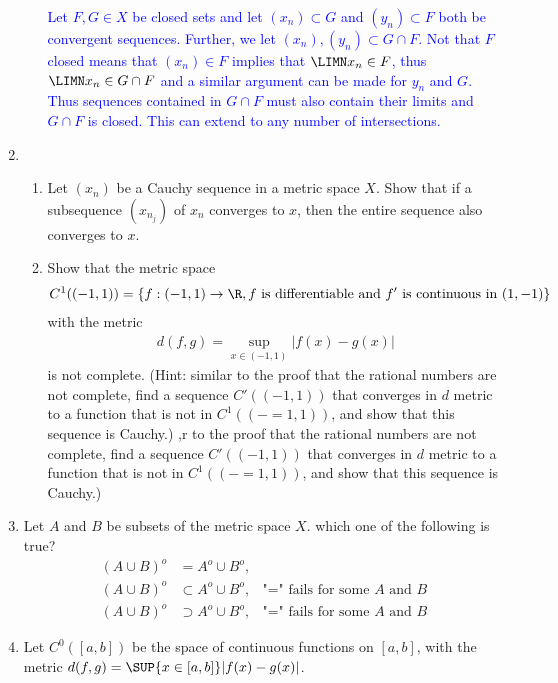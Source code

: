 \documentclass[10pt,a4paper]{report}
\newcommand{\BLUE}[1]{\textcolor{blue}{#1}}
\begin{document}
\begin{enumerate}[label=\Roman*.]
\begin{enumerate}[label=(\alph*)]
		\BLUE{Let $F, G \in X$ be closed sets and let $(x_n) \subset G$ and $(y_n) \subset F$ both be convergent sequences. Further, we let $(x_n), (y_n) \subset G\cap F$. Not that $F$ closed means that $(x_n) \in F$ implies that $\LIMN x_n \in F$, thus $\LIMN x_n \in G \cap F$ and a similar argument can be made for $y_n$ and $G$.  Thus sequences contained in $G\cap F$ must also contain their limits and $G\cap F$ is closed.  This can extend to any number of intersections.
		}
	\end{enumerate}
	
	\item\begin{enumerate}[label=(\alph*)]
		\item Let $(x_n)$ be a Cauchy sequence in a metric space $X$.  Show that if a subsequence $(x_{n_j})$ of $x_n$ converges to $x$, then the entire sequence also converges to $x$.
		\item Show that the metric space
		\begin{align*}
			C^1((-1,1))=\{f:(-1,1)\to\R, f \text{ is differentiable and }f'\text{ is continuous in }(1,-1)\}
		\end{align*}with the metric
		\begin{align*}
			d(f,g) = \sup_{x\in (-1,1)} |f(x)-g(x)|
		\end{align*}is not complete.  (Hint: similar to the proof that the rational numbers are not complete, find a sequence $C'((-1,1))$ that converges in $d$ metric to a function that is not in $C^1((-=1,1))$, and show that this sequence is Cauchy.)
,r to the proof that the rational numbers are not complete, find a sequence $C'((-1,1))$ that converges in $d$ metric to a function that is not in $C^1((-=1,1))$, and show that this sequence is Cauchy.)
	\end{enumerate}
	
	\item Let $A$ and $B$ be subsets of the metric space $X$.  which one of the following is true?
	\begin{align}
		(A\cup B)^o &= A^o \cup B^o, &\label{eq:eq1}\tag{2.1}\\
		(A \cup B)^o &\subset A^o\cup B^o, & \text{"=" fails for some $A$ and $B$} \label{eq:eq1}\tag{2.2} \\
		(A\cup B)^o &\supset A^o\cup B^o, &\text{"=" fails for some $A$ and $B$}\label{eq:eq1}\tag{2.3}
	\end{align}
	
	\item Let $C^0([a,b])$ be the space of continuous functions on $[a,b]$, with the metric $d(f,g) = \SUP{x\in [a,b]}|f(x)-g(x)|$.
	

\end{enumerate}
\end{document}
